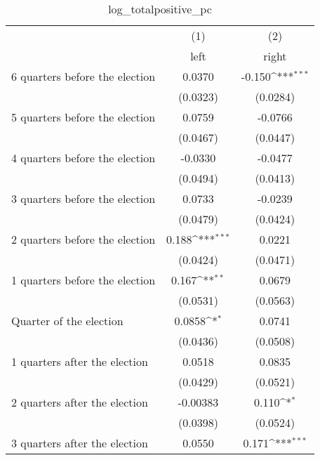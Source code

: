\begin{table}[htbp]\centering
\def\sym#1{\ifmmode^{#1}\else\(^{#1}\)\fi}
\caption{log\_totalpositive\_pc}
\begin{tabular}{l*{2}{c}}
\hline\hline
                    &\multicolumn{1}{c}{(1)}&\multicolumn{1}{c}{(2)}\\
                    &\multicolumn{1}{c}{left}&\multicolumn{1}{c}{right}\\
\hline
 6 quarters before the election&      0.0370         &      -0.150\sym{***}\\
                    &    (0.0323)         &    (0.0284)         \\
[1em]
 5 quarters before the election&      0.0759         &     -0.0766         \\
                    &    (0.0467)         &    (0.0447)         \\
[1em]
 4 quarters before the election&     -0.0330         &     -0.0477         \\
                    &    (0.0494)         &    (0.0413)         \\
[1em]
 3 quarters before the election&      0.0733         &     -0.0239         \\
                    &    (0.0479)         &    (0.0424)         \\
[1em]
 2 quarters before the election&       0.188\sym{***}&      0.0221         \\
                    &    (0.0424)         &    (0.0471)         \\
[1em]
 1 quarters before the election&       0.167\sym{**} &      0.0679         \\
                    &    (0.0531)         &    (0.0563)         \\
[1em]
Quarter of the election&      0.0858\sym{*}  &      0.0741         \\
                    &    (0.0436)         &    (0.0508)         \\
[1em]
 1 quarters after the election&      0.0518         &      0.0835         \\
                    &    (0.0429)         &    (0.0521)         \\
[1em]
 2 quarters after the election&    -0.00383         &       0.110\sym{*}  \\
                    &    (0.0398)         &    (0.0524)         \\
[1em]
 3 quarters after the election&      0.0550         &       0.171\sym{***}\\

\end{tabular}
\end{table}
